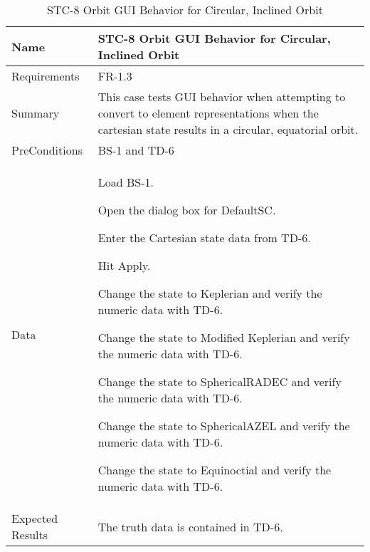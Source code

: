 \begin{table}[htbp!]
\centering
      \begin{tabular}{|p{1.05 in} |p{4.75 in} |}
      \hline
         \rowcolor[rgb]{0.8,0.8,0.8} Name & STC-8 Orbit GUI Behavior for Circular, Inclined Orbit\\
         \hline
         Requirements & FR-1.3\\  \hline
         Summary &
         This  case tests GUI behavior when attempting to convert to element representations when the
         cartesian state results in a circular, equatorial orbit.
         \\     \hline
         PreConditions & BS-1 and TD-6\\     \hline
         Data &
         \begin{compactenum}
             \item Load BS-1.
             \item Open the dialog box for DefaultSC.
             \item Enter the Cartesian state data from TD-6.
             \item Hit Apply.
             \item Change the state to Keplerian and verify the numeric data with TD-6.
             \item Change the state to Modified Keplerian and verify the numeric data with TD-6.
             \item Change the state to SphericalRADEC and verify the numeric data with TD-6.
             \item Change the state to SphericalAZEL and verify the numeric data with TD-6.
             \item Change the state to Equinoctial and verify the numeric data with TD-6.
         \end{compactenum}
         \\ \hline
         Expected Results & The truth data is contained in TD-6.\\
      \hline
      \end{tabular}
      \label{Table:STC-8}
      \caption{STC-8 Orbit GUI Behavior for Circular, Inclined Orbit}
\end{table} 
